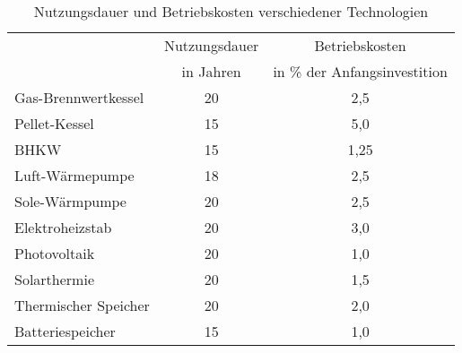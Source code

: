 \begin{table}[H]\centering
\begin{tabular}{|l|c|c|}
\hline
\rowcolor[HTML]{C0C0C0} 
\cellcolor[HTML]{C0C0C0} & Nutzungsdauer & Betriebskosten \\ \cline{2-3} 
\rowcolor[HTML]{C0C0C0} 
\multirow{-2}{*}{\cellcolor[HTML]{C0C0C0}Technologie} & in Jahren & in \% der Anfangsinvestition \\ \hline
Gas-Brennwertkessel & 20 & 2,5 \\ \hline
\rowcolor[HTML]{EFEFEF} 
Pellet-Kessel & 15 & 5,0 \\ \hline
BHKW & 15 & 1,25 \\ \hline
\rowcolor[HTML]{EFEFEF} 
Luft-Wärmepumpe & 18 & 2,5 \\ \hline
Sole-Wärmpumpe & 20 & 2,5 \\ \hline
\rowcolor[HTML]{EFEFEF} 
Elektroheizstab & 20 & 3,0 \\ \hline
Photovoltaik & 20 & 1,0 \\ \hline
\rowcolor[HTML]{EFEFEF} 
Solarthermie & 20 & 1,5 \\ \hline
Thermischer Speicher & 20 & 2,0 \\ \hline
\rowcolor[HTML]{EFEFEF} 
Batteriespeicher & 15 & 1,0 \\ \hline
\end{tabular}
\caption{Nutzungsdauer und Betriebskosten verschiedener Technologien}
\label{tab: TabelleA5}
\end{table}

